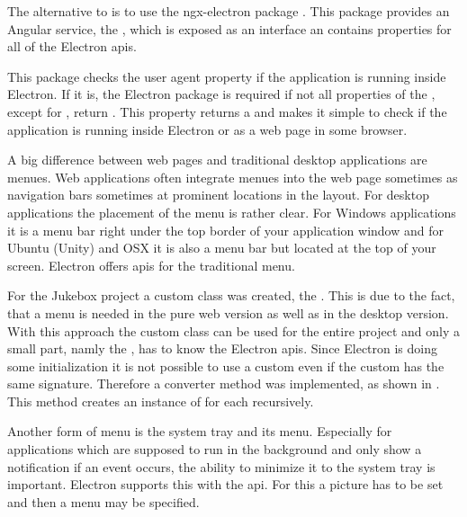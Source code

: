 
The alternative to  is to use the ngx-electron package \cite{ngxElectron}. This package provides an Angular service, the , which is exposed as an interface an contains properties for all of the Electron \gls{api}s.

This package checks the user agent property if the application is running inside Electron. If it is, the Electron package is required if not all properties of the , except for , return . This  property returns a  and makes it simple to check if the application is running inside Electron or as a web page in some browser.


A big difference between web pages and traditional desktop applications are menues. Web applications often integrate menues into the web page sometimes as navigation bars sometimes at prominent locations in the layout. For desktop applications the placement of the menu is rather clear. For Windows applications it is a menu bar right under the top border of your application window and for Ubuntu (Unity) and OSX it is also a menu bar but located at the top of your screen. Electron offers \gls{api}s for the traditional menu.



For the Jukebox project a custom  class was created, the . This is due to the fact, that a menu is needed in the pure web version as well as in the desktop version. With this approach the custom class can be used for the entire project and only a small part, namly the , has to know the Electron \gls{api}s. Since Electron is doing some initialization it is not possible to use a custom  even if the custom  has the same signature. Therefore a converter method was implemented, as shown in . This method creates an instance of  for each  recursively.



Another form of menu is the system tray and its menu. Especially for applications which are supposed to run in the background and only show a notification if an event occurs, the ability to minimize it to the system tray is important. Electron supports this with the  \gls{api}. For this a picture has to be set and then a menu may be specified.


